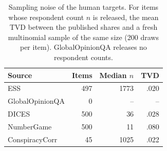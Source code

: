 \begin{table}[t]
\centering\scriptsize
\begin{tabular}{@{}lrrr@{}}
\toprule
Source & Items & Median $n$ & TVD \\
\midrule
ESS & 497 & 1773 & .020 \\
GlobalOpinionQA & 0 & -- & -- \\
DICES & 500 & 36 & .028 \\
NumberGame & 500 & 11 & .080 \\
ConspiracyCorr & 45 & 1025 & .022 \\
\bottomrule
\end{tabular}
\caption{Sampling noise of the human targets. For items whose respondent count $n$ is released, the mean TVD between the published shares and a fresh multinomial sample of the same size (200 draws per item). GlobalOpinionQA releases no respondent counts.}
\label{tab:target-noise}
\end{table}
